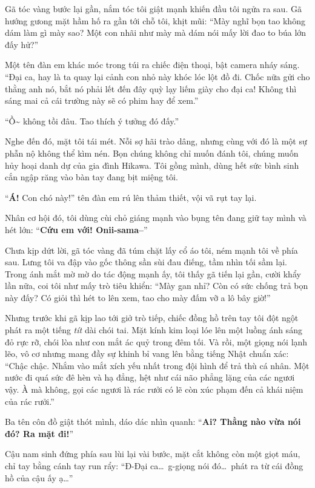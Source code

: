\documentclass[../main.tex]{subfiles}
\begin{document}
Gã tóc vàng bước lại gần, nắm tóc tôi giật mạnh khiến đầu tôi ngửa ra sau. Gã hướng gưong mặt hầm hố ra gần tới chỗ tôi, khịt mũi: ``Mày nghĩ bọn tao không dám làm gì mày sao? Một con nhãi như mày mà dám nói mấy lời đao to búa lớn đấy hử?''

Một tên đàn em khác móc trong túi ra chiếc điện thoại, bật camera nháy sáng. ``Đại ca, hay là ta quay lại cảnh con nhỏ này khóc lóc lột đồ đi. Chốc nữa gửi cho thằng anh nó, bắt nó phải lết đến đây quỳ lạy liếm giày cho đại ca! Không thì sáng mai cả cái trường này sẽ có phim hay để xem.''

``Ồ\~{} không tồi đâu. Tao thích ý tưởng đó đấy.''

Nghe đến đó, mặt tôi tái mét. Nỗi sợ hãi trào dâng, nhưng cùng với đó là một sự phẫn nộ không thể kìm nén. Bọn chúng không chỉ muốn đánh tôi, chúng muốn hủy hoại danh dự của gia đình Hikawa. Tôi gồng mình, dùng hết sức bình sinh cắn ngập răng vào bàn tay đang bịt miệng tôi.

``\textbf{Á!} Con chó này!'' tên đàn em rú lên thảm thiết, vội vã rụt tay lại.

Nhân cơ hội đó, tôi dùng cùi chỏ giáng mạnh vào bụng tên đang giữ tay mình và hét lớn: ``\textbf{Cứu em với! Onii-sama--}''

Chưa kịp dứt lời, gã tóc vàng đã túm chặt lấy cổ áo tôi, ném mạnh tôi về phía sau. Lưng tôi va đập vào gốc thông sần sùi đau điếng, tầm nhìn tối sầm lại. Trong ánh mắt mờ mờ do tác động mạnh ấy, tôi thấy gã tiến lại gần, cười khẩy lần nữa, coi tôi như mấy trò tiêu khiển: ``Mày gan nhỉ? Còn có sức chống trả bọn này đấy? Có giỏi thì hét to lên xem, tao cho mày đấm vỡ a lô bây giờ!''

Nhưng trước khi gã kịp lao tới giở trò tiếp, chiếc đồng hồ trên tay tôi đột ngột phát ra một tiếng \textit{tít} dài chói tai. Mặt kính kim loại lóe lên một luồng ánh sáng đỏ rực rỡ, chói lòa như con mắt ác quỷ trong đêm tối. Và rồi, một giọng nói lạnh lẽo, vô cơ nhưng mang đầy sự khinh bỉ vang lên bằng tiếng Nhật chuẩn xác: ``Chậc chậc. Nhắm vào mắt xích yếu nhất trong đội hình để trả thù cá nhân. Một nước đi quá sức đê hèn và hạ đẳng, hệt như cái não phẳng lặng của các ngươi vậy. À mà không, gọi các ngươi là rác rưởi có lẽ còn xúc phạm đến cả khái niệm của rác rưởi.''

Ba tên côn đồ giật thót mình, dáo dác nhìn quanh: ``\textbf{Ai? Thằng nào vừa nói đó? Ra mặt đi!}''

Cậu nam sinh đứng phía sau lùi lại vài bước, mặt cắt không còn một giọt máu, chỉ tay bằng cánh tay run rẩy: ``Đ-Đại ca\dots\ g-giọng nói đó\dots\ phát ra từ cái đồng hồ của cậu ấy ạ\dots''
\end{document}
